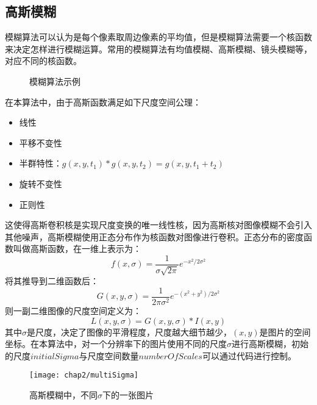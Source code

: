     \subsection{高斯模糊}
      模糊算法可以认为是每个像素取周边像素的平均值，但是模糊算法需要一个核函数来决定怎样进行模糊运算。常用的模糊算法有均值模糊、高斯模糊、镜头模糊等，对应不同的核函数。
      \begin{figure}[!htp]
        \centering
        \hspace{1cm}
        \hspace{1cm}
        \caption{模糊算法示例}
      \end{figure}
      在本算法中，由于高斯函数满足如下尺度空间公理\cite{burt1983laplacian}：
      \begin{itemize}
        \item 线性
        \item 平移不变性
        \item 半群特性：$g(x,y,t_1)*g(x,y,t_2)=g(x,y,t_1+t_2)$
        \item 旋转不变性
        \item 正则性
      \end{itemize}
      这使得高斯卷积核是实现尺度变换的唯一线性核，因为高斯核对图像模糊不会引入其他噪声，高斯模糊使用正态分布作为核函数对图像进行卷积。正态分布的密度函数叫做高斯函数，在一维上表示为：
      \begin{equation}
        f(x,\sigma)=\frac{1}{\sigma\sqrt{2\pi}}e^{-x^{2}/2\sigma^2}
      \end{equation}
      将其推导到二维函数后：
      \begin{equation}
        G(x,y,\sigma)=\frac{1}{2\pi\sigma^2}e^{-(x^2+y^2)/2\sigma^2}
      \end{equation}
      则一副二维图像的尺度空间定义为：
      \begin{equation}
        L(x,y,\sigma)=G(x,y,\sigma)*I(x,y)
      \end{equation}
      其中$\sigma$是尺度，决定了图像的平滑程度，尺度越大细节越少，$(x,y)$是图片的空间坐标。在本算法中，对一个分辨率下的图片使用不同的尺度$\sigma$进行高斯模糊，初始的尺度$initialSigma$与尺度空间数量$numberOfScales$可以通过代码进行控制。
      \begin{figure}[htp]
        \centering
        \texttt{[image: chap2/multiSigma]}
        \caption{高斯模糊中，不同$\sigma$下的一张图片}
      \end{figure}
